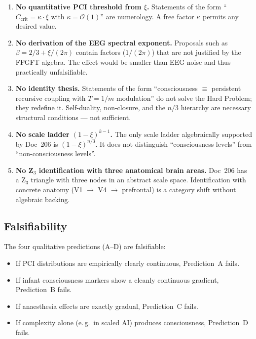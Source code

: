 \begin{enumerate}
\item \textbf{No quantitative PCI threshold from $\xi$.} Statements of the form ``$C_{\text{crit}} = \kappa \cdot \xi$ with $\kappa = \mathcal{O}(1)$'' are numerology. A free factor $\kappa$ permits any desired value.
\item \textbf{No derivation of the EEG spectral exponent.} Proposals such as $\beta = 2/3 + \xi/(2\pi)$ contain factors ($1/(2\pi)$) that are not justified by the FFGFT algebra. The effect would be smaller than EEG noise and thus practically unfalsifiable.
\item \textbf{No identity thesis.} Statements of the form ``consciousness $\equiv$ persistent recursive coupling with $T = 1/m$ modulation'' do not solve the Hard Problem; they redefine it. Self-duality, non-closure, and the $n/3$ hierarchy are necessary structural conditions --- not sufficient.
\item \textbf{No scale ladder $(1-\xi)^{k-1}$.} The only scale ladder algebraically supported by Doc~206 is $(1-\xi)^{n/3}$. It does not distinguish ``consciousness levels'' from ``non-consciousness levels''.
\item \textbf{No Z$_3$ identification with three anatomical brain areas.} Doc~206 has a Z$_3$ triangle with three nodes in an abstract scale space. Identification with concrete anatomy (V1 $\to$ V4 $\to$ prefrontal) is a category shift without algebraic backing.
\end{enumerate}

\subsection{Falsifiability}\label{sec:predictions_falsification}

The four qualitative predictions (A--D) are falsifiable:

\begin{itemize}
\item If PCI distributions are empirically clearly continuous, Prediction~A fails.
\item If infant consciousness markers show a cleanly continuous gradient, Prediction~B fails.
\item If anaesthesia effects are exactly gradual, Prediction~C fails.
\item If complexity alone (e.\,g.\ in scaled AI) produces consciousness, Prediction~D fails.
\end{itemize}

